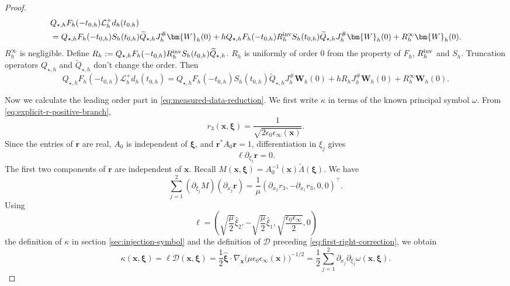 \documentclass[11pt,reqno]{amsart}
\numberwithin{equation}{section}
\begin{document}
\begin{proof}
\begin{align*}
    &Q_{\star,h}F_h(-t_{0,h})\mathcal L_h^+d_h(t_{0,h}) \\ 
    &=Q_{\star,h}F_h(-t_{0,h})S_h(t_{0,h})\widetilde{Q}_{\star,h}J_h^\#\bm{W}_h(0)+hQ_{\star,h}F_h(-t_{0,h})R_h^{\rm inv}S_h(t_{0,h})\widetilde{Q}_{\star,h}J_h^\#\bm{W}_h(0)+R_h^\infty\bm{W}_h(0).
\end{align*}
$R_h^\infty$ is negligible. Define $R_h:=Q_{\star,h}F_h(-t_{0,h})R_h^{\rm inv}S_h(t_{0,h})\widetilde{Q}_{\star,h}$. $R_h$ is uniformly of order 0 from the property of $F_h$, $R_h^{\rm inv}$ and $S_h$. Truncation operators $Q_{\star,h}$ and $\widetilde{Q}_{\star,h}$ don't change the order. Then 
\begin{equation}\label{eq:measured-data-reduction}
    Q_{\star,h}F_h(-t_{0,h})\mathcal L_h^+d_h(t_{0,h}) =Q_{\star,h}F_h(-t_{0,h})S_h(t_{0,h})\widetilde{Q}_{\star,h}J_h^\#\bm{W}_h(0)+hR_hJ_h^\#\bm{W}_h(0)+R_h^\infty\bm{W}_h(0).
\end{equation}

Now we calculate the leading order part in \eqref{eq:measured-data-reduction}. We first write $\kappa$ in terms of the known principal symbol $\omega$. From \eqref{eq:explicit-r-positive-branch},
\begin{equation*}
 r_3(\bm x,\bm\xi)=\frac{1}{\sqrt{2\epsilon_0\epsilon_\infty(\bm x)}}.
\end{equation*}
Since the entries of $\bm r$ are real, $A_0$ is independent of $\bm\xi$, and $\bm r^*A_0\bm r=1$, differentiation in $\xi_j$ gives
\begin{equation*}
 \bm\ell\partial_{\xi_j}\bm r=0.
\end{equation*}
The first two components of $\bm r$ are independent of $\bm x$. Recall $M(\bm x,\bm\xi) = A_0^{-1}(\bm x)\widetilde\Lambda(\bm\xi)$. We have
\begin{equation*}
 \sum_{j=1}^2(\partial_{\xi_j}M)(\partial_{x_j}\bm r)=\frac1\mu(\partial_{x_2}r_3,-\partial_{x_1}r_3,0,0)^\top.
\end{equation*}
Using
\begin{equation*}
 \bm\ell=\left(\sqrt{\frac\mu2}\widehat\xi_2,-\sqrt{\frac\mu2}\widehat\xi_1,\sqrt{\frac{\epsilon_0\epsilon_\infty}2},0\right)
\end{equation*}
the definition of $\kappa$ in section \ref{sec:injection-symbol} and the definition of $\bm{\mathcal D}$ preceding \eqref{eq:first-right-correction}, we obtain
\begin{equation*}
 \kappa(\bm x,\bm\xi)=\bm\ell\bm{\mathcal D}(\bm x,\bm\xi)=\frac12\widehat{\bm\xi}\cdot\nabla_{\bm x}\bigl(\mu\epsilon_0\epsilon_\infty(\bm x)\bigr)^{-1/2}=\frac12\sum_{j=1}^2
 \partial_{x_j}\partial_{\xi_j}\omega(\bm x,\bm\xi).
\end{equation*}


\end{proof}
\end{document}
